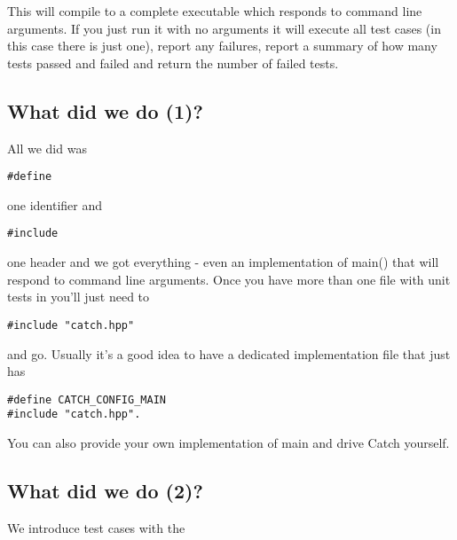 This will compile to a complete executable which responds to command line arguments. If you just run it with no arguments it will execute all test cases (in this case there is just one), report any failures, report a summary of how many tests passed and failed and return the number of failed tests.

\subsection*{What did we do (1)?}
All we did was 


\begin{verbatim}
#define 

\end{verbatim}

one identifier and 


\begin{verbatim}
#include 

\end{verbatim}

one header and we got everything - even an implementation of main() that will respond to command line arguments. 
Once you have more than one file with unit tests in you'll just need to 


\begin{verbatim}
#include "catch.hpp" 

\end{verbatim}

and go. Usually it's a good idea to have a dedicated implementation file that just has 



\begin{verbatim}
#define CATCH_CONFIG_MAIN 
#include "catch.hpp". 

\end{verbatim}

You can also provide your own implementation of main and drive Catch yourself.

\subsection*{What did we do (2)?}
We introduce test cases with the 


